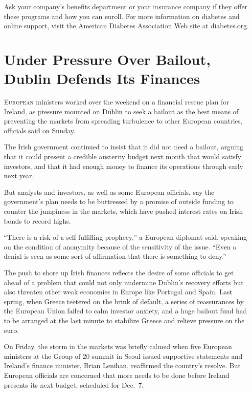 ﻿\documentclass[12pt]{article}
\begin{document}
Ask your company's benefits department or your insurance company if they offer these programs and
how you can enroll. For more information on diabetes and online support, visit the American Diabetes
Association Web site at diabetes.org.

\section{Under Pressure Over Bailout, Dublin Defends Its Finances}

\lettrine{E}{uropean} ministers worked over the weekend on a financial
rescue plan for Ireland, as pressure mounted on Dublin to seek a bailout as the best means of
preventing the markets from spreading turbulence to other European countries, officials said on
Sunday.

The Irish government continued to insist that it did not need a bailout, arguing that it could
present a credible austerity budget next month that would satisfy investors, and that it had enough
money to finance its operations through early next year.

But analysts and investors, as well as some European officials, say the government's plan needs to
be buttressed by a promise of outside funding to counter the jumpiness in the markets, which have
pushed interest rates on Irish bonds to record highs.

``There is a risk of a self-fulfilling prophecy,'' a European diplomat said, speaking on the
condition of anonymity because of the sensitivity of the issue. ``Even a denial is seen as some sort
of affirmation that there is something to deny.''

The push to shore up Irish finances reflects the desire of some officials to get ahead of a problem
that could not only undermine Dublin's recovery efforts but also threaten other weak economies in
Europe like Portugal and Spain. Last spring, when Greece teetered on the brink of default, a series
of reassurances by the European Union failed to calm investor anxiety, and a huge bailout fund had
to be arranged at the last minute to stabilize Greece and relieve pressure on the euro.

On Friday, the storm in the markets was briefly calmed when five European ministers at the Group of
20 summit in Seoul issued supportive statements and Ireland's finance minister, Brian Lenihan,
reaffirmed the country's resolve. But European officials are concerned that more needs to be done
before Ireland presents its next budget, scheduled for Dec.~7.
\end{document}
